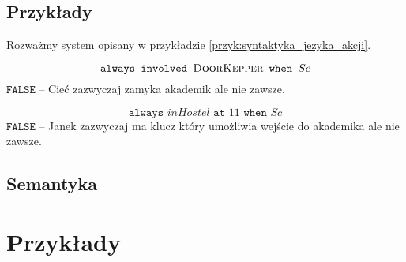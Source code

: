 \subsection{Przykłady}
Rozważmy system opisany w przykładzie \ref{przyk:syntaktyka_jezyka_akcji}.
\begin{example}
	$$
	\texttt{always involved } \textsc{DoorKepper} \texttt{ when } Sc
	$$
	$\texttt{FALSE}$ -- Cieć zazwyczaj zamyka akademik ale nie zawsze.
\end{example}
\begin{example}
	$$
	\texttt{always } inHostel \texttt{ at } 11 \texttt{ when } Sc
	$$
	$\texttt{FALSE}$ -- Janek zazwyczaj ma klucz który umożliwia wejście do akademika ale nie zawsze.
\end{example}


\subsection{Semantyka}

\section{Przykłady}


